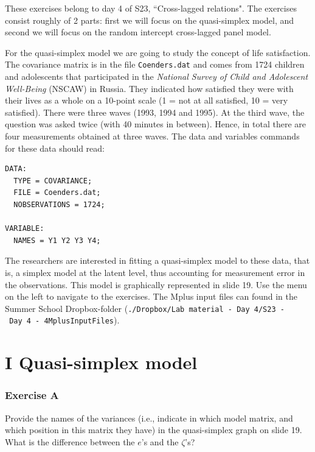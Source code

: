 \documentclass[
]{book}
\begin{document}
These exercises belong to day 4 of S23, ``Cross-lagged relations". The exercises consist roughly of 2 parts: first we will focus on the quasi-simplex model, and second we will focus on the random intercept cross-lagged panel model.

For the quasi-simplex model we are going to study the concept of life satisfaction. The covariance matrix is in the file \texttt{Coenders.dat} and comes from 1724 children and adolescents that participated in the \emph{National Survey of Child and Adolescent Well-Being} (NSCAW) in Russia. They indicated how satisfied they were with their lives as a whole on a 10-point scale (1 = not at all satisfied, 10 = very satisfied). There were three waves (1993, 1994 and 1995). At the third wave, the question was asked twice (with 40 minutes in between). Hence, in total there are four measurements obtained at three waves. The data and variables commands for these data should read:

\begin{verbatim}
DATA: 
  TYPE = COVARIANCE;
  FILE = Coenders.dat;
  NOBSERVATIONS = 1724;

VARIABLE: 
  NAMES = Y1 Y2 Y3 Y4;
\end{verbatim}

The researchers are interested in fitting a quasi-simplex model to these data, that is, a simplex model at the latent level, thus accounting for measurement error in the observations. This model is graphically represented in slide 19. Use the menu on the left to navigate to the exercises. The Mplus input files can found in the Summer School Dropbox-folder (\texttt{./Dropbox/Lab\ material\ -\ Day\ 4/S23\ -\ Day\ 4\ -\ 4MplusInputFiles}).

\hypertarget{i-quasi-simplex-model}{%
\section*{I Quasi-simplex model}\label{i-quasi-simplex-model}}

\hypertarget{exercise-a}{%
\subsubsection*{Exercise A}\label{exercise-a}}

Provide the names of the variances (i.e., indicate in which model matrix, and which position in this matrix they have) in the quasi-simplex graph on slide 19. What is the difference between the \(e\)'s and the \(\zeta\)'s?
\end{document}
